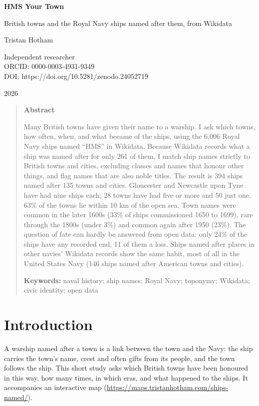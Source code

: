 \documentclass[11pt,a4paper]{article}
\begin{document}
\begin{center}
{\Large\bfseries HMS Your Town\par}
\vspace{0.4em}
{\large British towns and the Royal Navy ships named after them, from Wikidata\par}
\vspace{1.2em}
{\large Tristan Hotham\par}
\vspace{0.3em}
{\small Independent researcher\\
ORCID: 0000-0003-4931-9349\\
DOI: https://doi.org/10.5281/zenodo.24052719\par}
\vspace{0.8em}
2026
\end{center}

\begin{quote}
\small
\begin{center}\textbf{Abstract}\end{center}
Many British towns have given their name to a warship. I ask which towns, how often, when, and what became of the ships, using the 6,006 Royal Navy ships named ``HMS'' in Wikidata. Because Wikidata records what a ship was named after for only 261 of them, I match ship names strictly to British towns and cities, excluding classes and names that honour other things, and flag names that are also noble titles. The result is 394 ships named after 135 towns and cities. Gloucester and Newcastle upon Tyne have had nine ships each; 28 towns have had five or more and 50 just one. 63\% of the towns lie within 10 km of the open sea. Town names were common in the later 1600s (33\% of ships commissioned 1650 to 1699), rare through the 1800s (under 3\%) and common again after 1950 (23\%). The question of fate can hardly be answered from open data: only 24\% of the ships have any recorded end, 11 of them a loss. Ships named after places in other navies' Wikidata records show the same habit, most of all in the United States Navy (146 ships named after American towns and cities).

\textbf{Keywords:} naval history; ship names; Royal Navy; toponymy; Wikidata; civic identity; open data
\end{quote}

\section{Introduction}
A warship named after a town is a link between the town and the Navy: the ship carries the town's name, crest and often gifts from its people, and the town follows the ship. This short study asks which British towns have been honoured in this way, how many times, in which eras, and what happened to the ships. It accompanies an interactive map (\url{https://maps.tristanhotham.com/ships-named/}).
\end{document}
